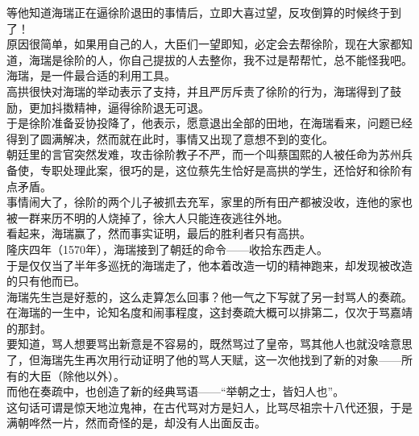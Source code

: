 \begin{multicols}{\theparacolNo}
等他知道海瑞正在逼徐阶退田的事情后，立即大喜过望，反攻倒算的时候终于到了！\\

原因很简单，如果用自己的人，大臣们一望即知，必定会去帮徐阶，现在大家都知道，海瑞是徐阶的人，你自己提拔的人去整你，我不过是帮帮忙，总不能怪我吧。\\

海瑞，是一件最合适的利用工具。\\

高拱很快对海瑞的举动表示了支持，并且严厉斥责了徐阶的行为，海瑞得到了鼓励，更加抖擞精神，逼得徐阶退无可退。\\

于是徐阶准备妥协投降了，他表示，愿意退出全部的田地，在海瑞看来，问题已经得到了圆满解决，然而就在此时，事情又出现了意想不到的变化。\\

朝廷里的言官突然发难，攻击徐阶教子不严，而一个叫蔡国熙的人被任命为苏州兵备使，专职处理此案，很巧的是，这位蔡先生恰好是高拱的学生，还恰好和徐阶有点矛盾。\\

事情闹大了，徐阶的两个儿子被抓去充军，家里的所有田产都被没收，连他的家也被一群来历不明的人烧掉了，徐大人只能连夜逃往外地。\\

看起来，海瑞赢了，然而事实证明，最后的胜利者只有高拱。\\

隆庆四年（1570年），海瑞接到了朝廷的命令——收拾东西走人。\\

于是仅仅当了半年多巡抚的海瑞走了，他本着改造一切的精神跑来，却发现被改造的只有他而已。\\

海瑞先生岂是好惹的，这么走算怎么回事？他一气之下写就了另一封骂人的奏疏。\\

在海瑞的一生中，论知名度和闹事程度，这封奏疏大概可以排第二，仅次于骂嘉靖的那封。\\

要知道，骂人想要骂出新意是不容易的，既然骂过了皇帝，骂其他人也就没啥意思了，但海瑞先生再次用行动证明了他的骂人天赋，这一次他找到了新的对象——所有的大臣（除他以外）。\\

而他在奏疏中，也创造了新的经典骂语——“举朝之士，皆妇人也”。\\

这句话可谓是惊天地泣鬼神，在古代骂对方是妇人，比骂尽祖宗十八代还狠，于是满朝哗然一片，然而奇怪的是，却没有人出面反击。\\


\end{multicols}
